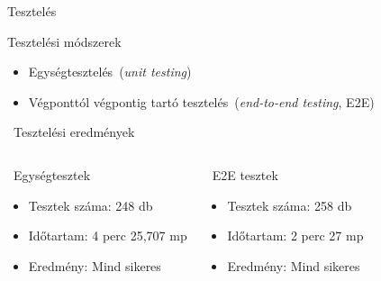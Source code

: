 \documentclass[11pt]{beamer}
\begin{document}
\begin{frame}{Tesztelés}
    \begin{block}{Tesztelési módszerek}
        \begin{itemize}
            \vspace{0.5em}
            \item Egységtesztelés~(\textit{unit testing})
            \vspace{0.5em}
            \item Végponttól végpontig tartó tesztelés~(\textit{end-to-end testing}, \textsc{E2E})
            \vspace{0.5em}
        \end{itemize}
    \end{block}
    \begin{block}{\faChartBar~Tesztelési eredmények}
        \vspace{-1em}
        \begin{columns}[t]
            \begin{block}{\faFileCode~Egységtesztek}
              \begin{itemize}
                \vspace{0.5em}
                \item Tesztek száma: \textcolor{secondary}{248} db
                \vspace{0.5em}
                \item Időtartam: \textcolor{secondary}{4} perc \textcolor{secondary}{25,707} mp
                \vspace{0.5em}
                \item Eredmény: \textcolor{secondary}{Mind sikeres}
                \vspace{0.5em}
              \end{itemize}
            \end{block}
            \begin{block}{\faGlobe~E2E tesztek}
              \begin{itemize}
                \vspace{0.5em}
                \item Tesztek száma: \textcolor{secondary}{258} db
                \vspace{0.5em}
                \item Időtartam: \textcolor{secondary}{2} perc \textcolor{secondary}{27} mp
                \vspace{0.5em}
                \item Eredmény: \textcolor{secondary}{Mind sikeres}
                \vspace{0.5em}
              \end{itemize}
            \end{block}
        \end{columns}
    \end{block}


\end{frame}
\end{document}
